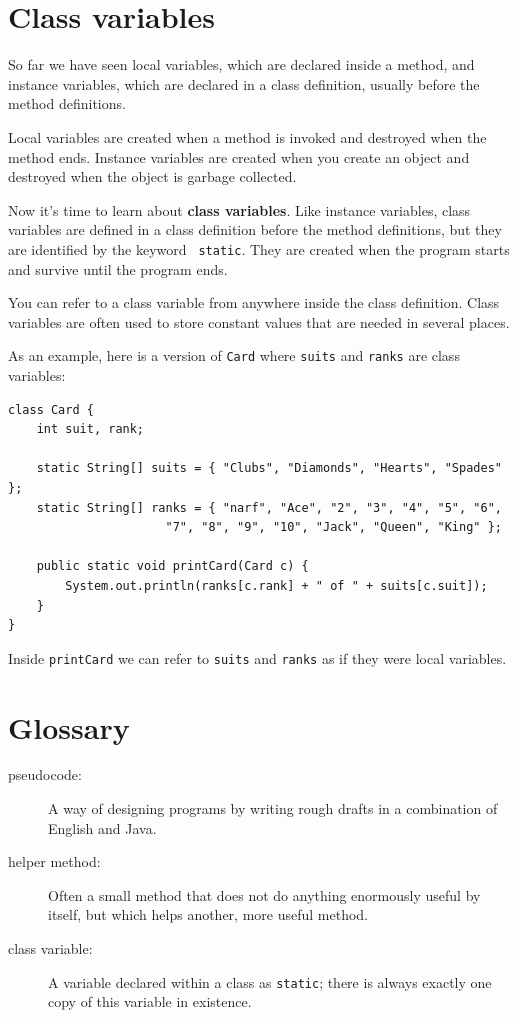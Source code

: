 \documentclass[12pt]{book}
\theoremstyle{exercise}
\begin{document}
\section{Class variables}

So far we have seen local variables, which are declared inside
a method, and instance variables, which are declared in a class
definition, usually before the method definitions.

Local variables are created when a method is invoked and destroyed
when the method ends.  Instance variables are created when you
create an object and destroyed when the object is garbage collected.

Now it's time to learn about {\bf class variables}.  Like instance
variables, class variables are defined in a class definition before
the method definitions, but they are identified by the keyword {\tt
  static}.  They are created when the program starts and survive until
the program ends.

You can refer to a class variable from anywhere inside the class
definition.  Class variables are often used to store constant
values that are needed in several places.

As an example, here is a version of {\tt Card} where {\tt suits}
and {\tt ranks} are class variables:

\begin{lstlisting}
class Card {
    int suit, rank;

    static String[] suits = { "Clubs", "Diamonds", "Hearts", "Spades" };
    static String[] ranks = { "narf", "Ace", "2", "3", "4", "5", "6",
                      "7", "8", "9", "10", "Jack", "Queen", "King" };

    public static void printCard(Card c) {
        System.out.println(ranks[c.rank] + " of " + suits[c.suit]);
    }
}
\end{lstlisting}

Inside {\tt printCard} we can refer to {\tt suits} and {\tt ranks} as
if they were local variables.


\section{Glossary}

\begin{description}

\item[pseudocode:]  A way of designing programs by writing
rough drafts in a combination of English and Java.

\item[helper method:]  Often a small method that does not
do anything enormously useful by itself, but which helps
another, more useful method.

\item[class variable:]  A variable declared within a class as {\tt static};
there is always exactly one copy of this variable in existence.



\end{description}
\end{document}
